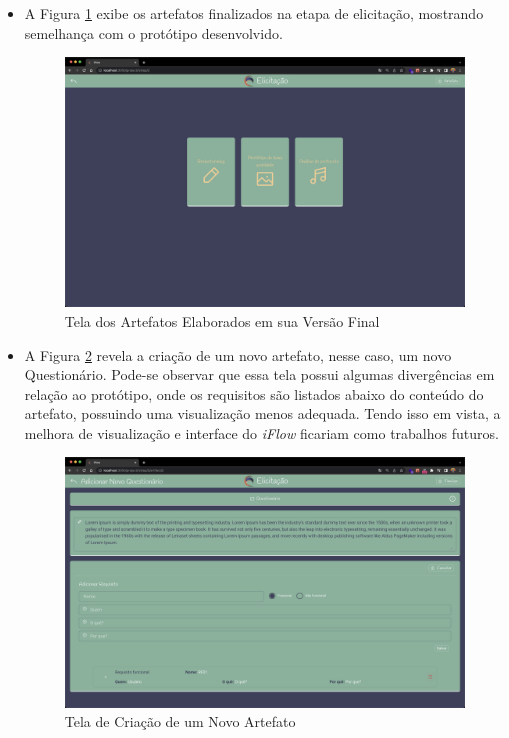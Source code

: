 \begin{itemize}
    \item A Figura \ref{fig:artefatos_completos_implementado} exibe os artefatos finalizados na etapa de elicitação, mostrando semelhança com o protótipo desenvolvido.
    \begin{figure}[]
      \begin{center}
          \caption{{Tela dos Artefatos Elaborados em sua Versão Final}}
          \label{fig:artefatos_completos_implementado}
          \includegraphics[scale=0.22]{figuras/TelasDesenvolvidas/completed-artifacts-implementado.png}
    \end{center}
    \end{figure}
    
    \item A Figura \ref{fig:novo_artefato} revela a criação de um novo artefato, nesse caso, um novo Questionário. Pode-se observar que essa tela possui algumas divergências em relação ao protótipo, onde os requisitos são listados abaixo do conteúdo do artefato, possuindo uma visualização menos adequada. Tendo isso em vista, a melhora de visualização e interface do \textit{iFlow} ficariam como trabalhos futuros.
    \begin{figure}[]
      \begin{center}
          \caption{{Tela de Criação de um Novo Artefato}}
          \label{fig:novo_artefato}
          \includegraphics[scale=0.22]{figuras/TelasDesenvolvidas/new-artifact.png}
    \end{center}
    \end{figure}


\end{itemize}
